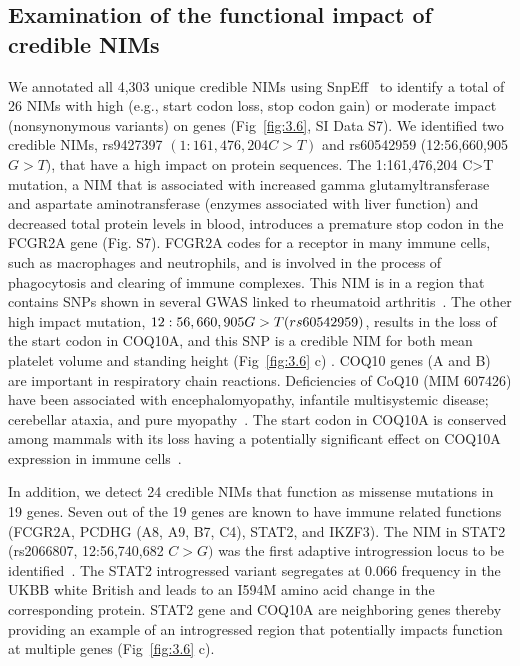 \subsection{Examination of the functional impact of credible NIMs}
We annotated all 4,303 unique credible NIMs using SnpEff~\cite{cingolani2012program} to identify a total of 26 NIMs with high (e.g., start codon loss, stop codon gain) or moderate impact (nonsynonymous variants) on genes (Fig~\ref{fig:3.6}, SI Data S7). We identified two credible NIMs, rs9427397 $(1:161,476,204 C>T)$ and rs60542959 (12:56,660,905 $G>T)$, that have a high impact on protein sequences. The 1:161,476,204 C>T mutation, a NIM that is associated with increased gamma glutamyltransferase and aspartate aminotransferase (enzymes associated with liver function) and decreased total protein levels in blood, introduces a premature stop codon in the FCGR2A gene (Fig. S7). FCGR2A codes for a receptor in many immune cells, such as macrophages and neutrophils, and is involved in the process of phagocytosis and clearing of immune complexes. This NIM is in a region that contains SNPs shown in several GWAS  linked to rheumatoid arthritis~\cite{okada2014raci,laufer2019influences}. The other high impact mutation, $12:56,660,905\\ G>T (rs60542959)$, results in the loss of the start codon in COQ10A, and this SNP is a credible NIM for both mean platelet volume and standing height (Fig~\ref{fig:3.6} c) . COQ10 genes (A and B) are important in respiratory chain reactions. Deficiencies of CoQ10 (MIM 607426) have been associated with encephalomyopathy, infantile multisystemic disease; cerebellar ataxia, and pure myopathy~\cite{quinzii2008human}. The start codon in COQ10A is conserved among mammals with its loss having a potentially significant effect on COQ10A expression in immune cells~\cite{kubota2020integrated}.

In addition, we detect 24 credible NIMs that function as missense mutations in 19 genes. Seven out of the 19 genes are known to have immune related functions (FCGR2A, PCDHG (A8, A9, B7, C4), STAT2, and IKZF3).  The NIM in STAT2 (rs2066807, 12:56,740,682 $C>G)$ was the first adaptive introgression locus to be identified~\cite{mendez2012at}. The STAT2 introgressed variant segregates at 0.066 frequency in the UKBB white British and leads to an I594M amino acid change in the corresponding protein. STAT2 gene and COQ10A are neighboring genes thereby providing an example of an introgressed region that potentially impacts function at multiple genes (Fig~\ref{fig:3.6} c). 

